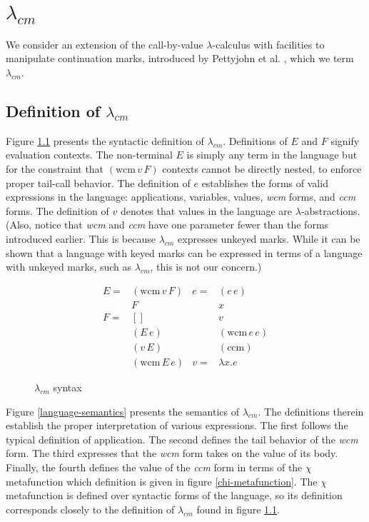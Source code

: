 \documentclass[ms,electronic,twosidetoc,letterpaper,chaptercenter,parttop]{byumsphd}
\newcommand{\app}[2]{(#1\,#2)}
\newcommand{\wcm}[2]{(\mathrm{wcm}\,#1\,#2)}
\newcommand{\ccm}{(\mathrm{ccm})}
\begin{document}
\chapter{$\lambda_{cm}$}

We consider an extension of the call-by-value $\lambda$-calculus with facilities to
manipulate continuation marks, introduced by Pettyjohn et al.
\cite{pettyjohn2005continuations}, which we term $\lambda_{cm}$.

\section{Definition of $\lambda_{cm}$}

Figure \ref{language-syntax} presents the syntactic definition of $\lambda_{cm}$.
Definitions of $E$ and $F$ signify evaluation contexts. The non-terminal $E$ is simply any
term in the language but for the constraint that $\wcm{v}{F}$ contexts cannot be
directly nested, to enforce proper tail-call behavior. The definition of $e$ establishes
the forms of valid expressions in the language: applications, variables, values,
\emph{wcm} forms, and \emph{ccm} forms. The definition of $v$ denotes that values in the
language are $\lambda$-abstractions. (Also, notice that \emph{wcm} and \emph{ccm} have one
parameter fewer than the forms introduced earlier. This is because $\lambda_{cm}$
expresses unkeyed marks. While it can be shown that a language with keyed marks can be
expressed in terms of a language with unkeyed marks, such as $\lambda_{cm}$, this is not
our concern.)

\begin{figure}
\begin{align*}
E = &\wcm{v}{F} & e = &\app{e}{e}\\
    &F          &     &x\\
F = &[]         &     &v\\
    &\app{E}{e} &     &\wcm{e}{e}\\
    &\app{v}{E} &     &\ccm\\
    &\wcm{E}{e} & v = & \lambda x. e
\end{align*}
\caption{$\lambda_{cm}$ syntax}
\label{language-syntax}
\end{figure}

Figure \ref{language-semantics} presents the semantics of $\lambda_{cm}$. The definitions
therein establish the proper interpretation of various expressions. The first follows the
typical definition of application. The second defines the tail behavior of the \emph{wcm}
form. The third expresses that the \emph{wcm} form takes on the value of its body.
Finally, the fourth defines the value of the \emph{ccm} form in terms of the $\chi$
metafunction which definition is given in figure \ref{chi-metafunction}. The $\chi$
metafunction is defined over syntactic forms of the language, so its definition
corresponds closely to the definition of $\lambda_{cm}$ found in figure
\ref{language-syntax}.
\end{document}

